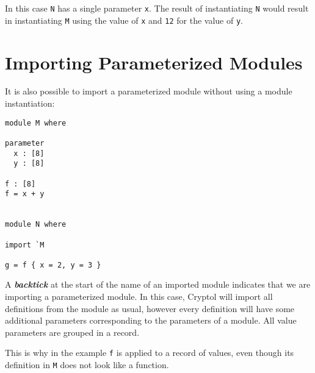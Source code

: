 In this case \texttt{N} has a single parameter \texttt{x}. The result of
instantiating \texttt{N} would result in instantiating \texttt{M} using
the value of \texttt{x} and \texttt{12} for the value of \texttt{y}.

\section{Importing Parameterized
Modules}\label{importing-parameterized-modules}

It is also possible to import a parameterized module without using a
module instantiation:

\begin{verbatim}
module M where

parameter
  x : [8]
  y : [8]

f : [8]
f = x + y


module N where

import `M

g = f { x = 2, y = 3 }
\end{verbatim}

A \textbf{\emph{backtick}} at the start of the name of an imported
module indicates that we are importing a parameterized module. In this
case, Cryptol will import all definitions from the module as usual,
however every definition will have some additional parameters
corresponding to the parameters of a module. All value parameters are
grouped in a record.

This is why in the example \texttt{f} is applied to a record of values,
even though its definition in \texttt{M} does not look like a function.
